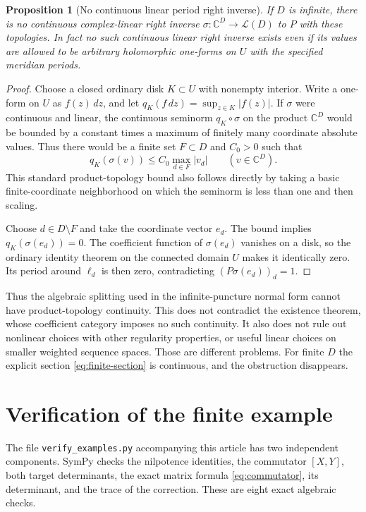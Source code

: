 \documentclass[11pt,letterpaper]{article}
\numberwithin{equation}{section}
\newtheorem{proposition}[theorem]{Proposition}
\theoremstyle{definition}
\theoremstyle{remark}
\newcommand{\C}{\mathbb C}
\newcommand{\LL}{\mathcal L}
\begin{document}
\begin{proposition}[No continuous linear period right inverse]
\label{prop:discontinuous}
If $D$ is infinite, there is no continuous complex-linear right inverse
$\sigma:\C^D\to\LL(D)$ to $P$ with these topologies. In fact no such
continuous linear right inverse exists even if its values are allowed to
be arbitrary holomorphic one-forms on $U$ with the specified meridian
periods.
\end{proposition}
\begin{proof}
Choose a closed ordinary disk $K\subset U$ with nonempty interior. Write a
one-form on $U$ as $f(z)\,dz$, and let
$q_K(f\,dz)=\sup_{z\in K}|f(z)|$.
If $\sigma$ were continuous and linear, the continuous seminorm
$q_K\circ\sigma$ on the product $\C^D$ would be bounded by a constant times
a maximum of finitely many coordinate absolute values. Thus there would
be a finite set $F\subset D$ and $C_0>0$ such that
\[
 q_K(\sigma(v))\leq C_0\max_{d\in F}|v_d|\qquad(v\in\C^D).
\]
This standard product-topology bound also follows directly by taking a
basic finite-coordinate neighborhood on which the seminorm is less than
one and then scaling.

Choose $d\in D\setminus F$ and take the coordinate vector $e_d$.
The bound implies $q_K(\sigma(e_d))=0$. The coefficient function of
$\sigma(e_d)$ vanishes on a disk, so the ordinary identity theorem on the
connected domain $U$ makes it identically zero. Its period around $\ell_d$
is then zero, contradicting $(P\sigma(e_d))_d=1$.
\end{proof}

Thus the algebraic splitting used in the infinite-puncture normal form
cannot have product-topology continuity. This does not contradict the
existence theorem, whose coefficient category imposes no such continuity.
It also does not rule out nonlinear choices with other regularity
properties, or useful linear choices on smaller weighted sequence spaces.
Those are different problems. For finite $D$ the explicit section
\eqref{eq:finite-section} is continuous, and the obstruction disappears.

\section{Verification of the finite example}\label{sec:verification}

The file \texttt{verify\_examples.py} accompanying this article has two
independent components. SymPy checks the nilpotence identities, the
commutator $[X,Y]$, both target determinants, the exact matrix formula
\eqref{eq:commutator}, its determinant, and the trace of the correction.
These are eight exact algebraic checks.
\end{document}
